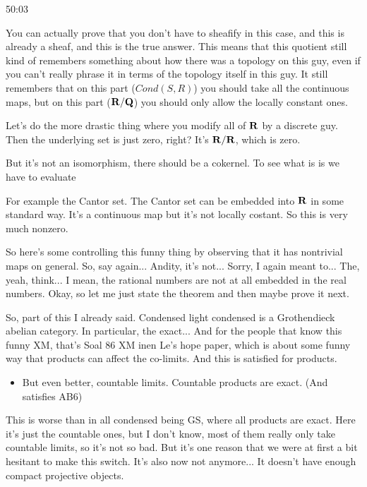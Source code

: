 \begin{example}
\begin{unfinished}{50:03}
\begin{remark}
\begin{example}
You can actually prove that you don't have to sheafify in this case, and this is already a sheaf, and this is the true answer. This means that this quotient still kind of remembers something about how there was a topology on this guy, even if you can't really phrase it in terms of the topology itself in this guy. It still remembers that on this part ($Cond(S,R)$) you should take all the continuous maps, but on this part ($\mathbf R/\mathbf Q$) you should only allow the locally constant ones.

Let's do the more drastic thing where you modify all of $\mathbf R$ by a discrete guy. Then the underlying set is just zero, right? It's $\mathbf R/\mathbf R$, which is zero.


But it's not an isomorphism, there should be a cokernel. To see what is is we have to evaluate


For example the Cantor set. The Cantor set can be embedded into $\mathbf R$ in some standard way. It's a continuous map but it's not locally costant. So this is very much nonzero.

So here's some controlling this funny thing by observing that it has nontrivial maps on general. So, say again... Andity, it's not... Sorry, I again meant to... The, yeah, think... I mean, the rational numbers are not at all embedded in the real numbers. Okay, so let me just state the theorem and then maybe prove it next.

\end{example}

So, part of this I already said. Condensed light condensed is a Grothendieck abelian category. In particular, the  exact...   And for the people that know this funny XM, that's Soal 86 XM inen Le's hope paper, which is about some funny way that products can affect the co-limits. And this is satisfied for products.

\begin{itemize}
\item But even better, countable limits. Countable products are exact. (And satisfies AB6)

\end{itemize}

This is worse than in all condensed being GS, where all products are exact. Here it's just the countable ones, but I don't know, most of them really only take countable limits, so it's not so bad. But it's one reason that we were at first a bit hesitant to make this switch. It's also now not anymore... It doesn't have enough compact projective objects.


\end{remark}
\end{unfinished}
\end{example}
